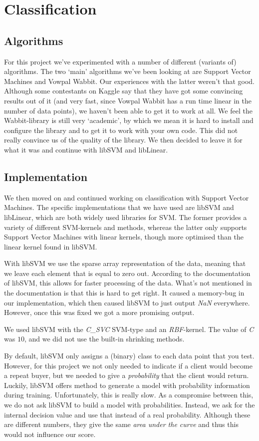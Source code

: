 \documentclass[a4paper]{article}
\begin{document}
\section{Classification}
\subsection{Algorithms}
For this project we've experimented with a number of different (variants of) algorithms. The two `main' algorithms we've been looking at are Support Vector Machines and Vowpal Wabbit. Our experiences with the latter weren't that good. Although some contestants on Kaggle say that they have got some convincing results out of it (and very fast, since Vowpal Wabbit has a run time linear in the number of data points), we haven't been able to get it to work at all. We feel the Wabbit-library is still very `academic', by which we mean it is hard to install and configure the library and to get it to work with your own code. This did not really convince us of the quality of the library. We then decided to leave it for what it was and continue with libSVM and libLinear.
\subsection{Implementation}
We then moved on and continued working on classification with Support Vector Machines. The specific implementations that we have used are libSVM and libLinear, which are both widely used libraries for SVM. The former provides a variety of different SVM-kernels and methods, whereas the latter only supports Support Vector Machines with linear kernels, though more optimised than the linear kernel found in libSVM.

With libSVM we use the sparse array representation of the data, meaning that we leave each element that is equal to zero out. According to the documentation of libSVM, this allows for faster processing of the data. What's not mentioned in the documentation is that this is hard to get right. It caused a memory-bug in our implementation, which then caused libSVM to just output \emph{NaN} everywhere. However, once this was fixed we got a more promising output.

We used libSVM with the \emph{C\_SVC} SVM-type and an \emph{RBF}-kernel. The value of \emph{C} was $10$, and we did not use the built-in shrinking methods.

By default, libSVM only assigns a (binary) class to each data point that you test. However, for this project we not only needed to indicate if a client would become a repeat buyer, but we needed to give a \emph{probability} that the client would return. Luckily, libSVM offers method to generate a model with probability information during training. Unfortunately, this is really slow. As a compromise between this, we do not ask libSVM to build a model with probabilities. Instead, we ask for the internal decision value and use that instead of a real probability. Although these are different numbers, they give the same \emph{area under the curve} and thus this would not influence our score.
\end{document}
